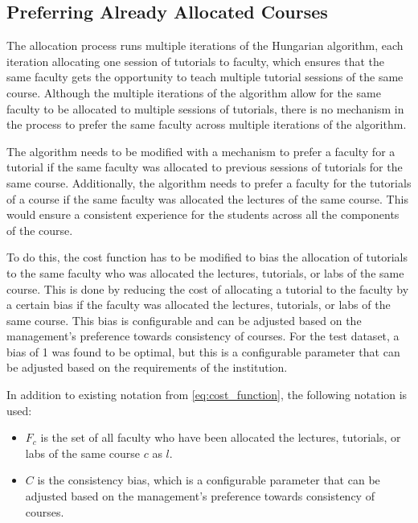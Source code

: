 \subsection{Preferring Already Allocated Courses}
\label{sec:cost_function_consistency}

The allocation process runs multiple iterations of the Hungarian algorithm, each iteration allocating one session of tutorials to faculty, which ensures that the same faculty gets the opportunity to teach multiple tutorial sessions of the same course. Although the multiple iterations of the algorithm allow for the same faculty to be allocated to multiple sessions of tutorials, there is no mechanism in the process to prefer the same faculty across multiple iterations of the algorithm.

The algorithm needs to be modified with a mechanism to prefer a faculty for a tutorial if the same faculty was allocated to previous sessions of tutorials for the same course. Additionally, the algorithm needs to prefer a faculty for the tutorials of a course if the same faculty was allocated the lectures of the same course. This would ensure a consistent experience for the students across all the components of the course.

To do this, the cost function has to be modified to bias the allocation of tutorials to the same faculty who was allocated the lectures, tutorials, or labs of the same course. This is done by reducing the cost of allocating a tutorial to the faculty by a certain bias if the faculty was allocated the lectures, tutorials, or labs of the same course. This bias is configurable and can be adjusted based on the management's preference towards consistency of courses. For the test dataset, a bias of 1 was found to be optimal, but this is a configurable parameter that can be adjusted based on the requirements of the institution.

In addition to existing notation from \autoref{eq:cost_function}, the following notation is used:

\begin{itemize}
  \item $F_c$ is the set of all faculty who have been allocated the lectures, tutorials, or labs of the same course $c$ as $l$.
  \item $C$ is the consistency bias, which is a configurable parameter that can be adjusted based on the management's preference towards consistency of courses.
\end{itemize}

